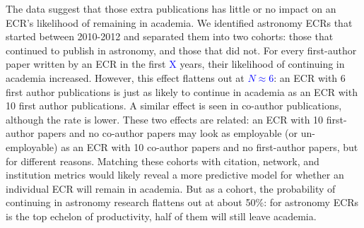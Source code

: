 \documentclass{nature}
\newcommand{\todo}[1]{\textcolor{blue}{#1}}
\begin{document}
The data suggest that those extra publications has little or no impact on an ECR's likelihood of remaining in academia. We identified astronomy ECRs that started between 2010-2012 and separated them into two cohorts: those that continued to publish in astronomy, and those that did not. For every first-author paper written by an ECR in the first \todo{X} years, their likelihood of continuing in academia increased. However, this effect flattens out at \todo{$N \approx 6$}: an ECR with 6 first author publications is just as likely to continue in academia as an ECR with 10 first author publications. A similar effect is seen in co-author publications, although the rate is lower. These two effects are related: an ECR with 10 first-author papers and no co-author papers may look as employable (or un-employable) as an ECR with 10 co-author papers and no first-author papers, but for different reasons. Matching these cohorts with citation, network, and institution metrics would likely reveal a more predictive model for whether an individual ECR will remain in academia. But as a cohort, the probability of continuing in astronomy research flattens out at about 50\%: for astronomy ECRs is the top echelon of productivity, half of them will still leave academia. 




\end{document}
